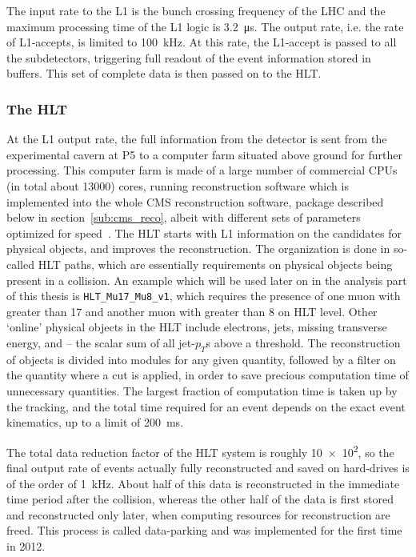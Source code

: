 The input rate to the L1 is the bunch crossing frequency of the LHC and the maximum processing time of the L1 logic is \SI{3.2}{\micro\second}. The output rate, 
i.e. the rate of L1-accepts, is limited to \SI{100}{\kilo\hertz}. At this rate, the
L1-accept is passed to all the subdetectors, triggering full readout of the event information stored in buffers. This set of complete data is then passed on to the HLT.

\subsubsection*{The HLT}
At the L1 output rate, the full information from the detector is sent from the experimental cavern at P5 to a computer farm situated above ground for further processing.
This computer farm is made of a large number of commercial CPUs (in total about \num{13000}) cores, running reconstruction software which is implemented into the whole 
CMS reconstruction software, package 
described below in section~\ref{sub:cms_reco}, albeit with different sets of parameters optimized for speed~\cite{hltcms, hltcms2}. The HLT starts with L1 information on the candidates for
physical objects, and improves the reconstruction. The organization is done in so-called HLT paths, which are essentially requirements on physical objects being present in
a collision. An example which will be used later on in the analysis part of this thesis is \texttt{HLT\_Mu17\_Mu8\_v1}, which requires the presence of one muon with \pt
greater than 17 \gev and another muon with \pt greater than 8 \gev on HLT level. Other `online' physical objects in the HLT include electrons, jets, missing transverse
energy, and \HT -- the scalar sum of all jet-$p_T$s above a threshold. The reconstruction of objects is divided into modules for any given quantity, followed by a filter on 
the quantity where a cut is applied, in order to save precious computation time of unnecessary quantities. The largest fraction of computation time is taken up by the tracking, and
the total time required for an event depends on the exact event kinematics, up to a limit of \SI{200}{\milli\second}.

The total data reduction factor of the HLT system is roughly \num{10e2}, so the final output rate of events actually fully reconstructed and saved on hard-drives is of the order
of \SI{1}{\kilo\hertz}. About half of this data is reconstructed in the immediate time period after the collision, whereas the other half of the data is first stored and 
reconstructed only later, when computing resources for reconstruction are freed. This process is called data-parking and was implemented for the first time in 2012.


